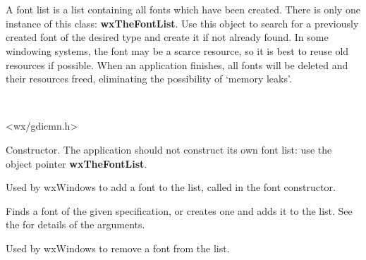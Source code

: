 \section{}\label{wxfontlist}

A font list is a list containing all fonts which have been created. There
is only one instance of this class: {\bf wxTheFontList}.  Use this object to search
for a previously created font of the desired type and create it if not already found.
In some windowing systems, the font may be a scarce resource, so it is best to
reuse old resources if possible.  When an application finishes, all fonts will be
deleted and their resources freed, eliminating the possibility of `memory leaks'.


\\


<wx/gdicmn.h>






Constructor. The application should not construct its own font list:
use the object pointer {\bf wxTheFontList}.



Used by wxWindows to add a font to the list, called in the font constructor.

\label{findorcreatefont}


Finds a font of the given specification, or creates one and adds it to the list. See the  for
details of the arguments.



Used by wxWindows to remove a font from the list.


